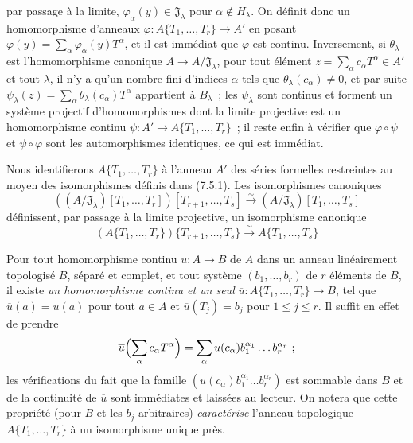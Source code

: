\begin{env}[7.5.1]
par passage à la limite, $\varphi_\alpha(y)\in\mathfrak J_\lambda$ pour
$\alpha\notin H_\lambda$. On définit donc un homomorphisme d'anneaux
$\varphi:A\{T_1,\ldots,T_r\}\to A'$ en posant
$\varphi(y)=\sum_\alpha\varphi_\alpha(y)T^\alpha$, et il est immédiat que
$\varphi$ est continu. Inversement, si $\theta_\lambda$ est l'homomorphisme
canonique $A\to A/\mathfrak J_\lambda$, pour tout élément
$z=\sum_\alpha c_\alpha T^\alpha\in A'$ et tout $\lambda$, il n'y a qu'un
nombre fini d'indices $\alpha$ tels que $\theta_\lambda(c_\alpha)\neq0$, et
par suite
$\psi_\lambda(z)=\sum_\alpha\theta_\lambda(c_\alpha)T^\alpha$ appartient à
$B_\lambda$~; les $\psi_\lambda$ sont continus et forment un système
projectif d'homomorphismes dont la limite projective est un homomorphisme
continu $\psi:A'\to A\{T_1,\ldots,T_r\}$~; il reste enfin à vérifier que
$\varphi\circ\psi$ et $\psi\circ\varphi$ sont les automorphismes identiques,
ce qui est immédiat.
\end{env}

\begin{env}[7.5.2]
\label{0.7.5.2-fr}
Nous identifierons $A\{T_1,\ldots,T_r\}$ à l'anneau $A'$ des séries formelles
restreintes au moyen des isomorphismes définis dans (7.5.1). Les isomorphismes
canoniques
\[
  ((A/\mathfrak J_\lambda)[T_1,\ldots,T_r])
  [T_{r+1},\ldots,T_s]
  \xrightarrow{\sim}
  (A/\mathfrak J_\lambda)[T_1,\ldots,T_s]
\]
définissent, par passage à la limite projective, un isomorphisme canonique
\[
  (A\{T_1,\ldots,T_r\})\{T_{r+1},\ldots,T_s\}
  \xrightarrow{\sim}
  A\{T_1,\ldots,T_s\}
\]
\end{env}

\begin{env}[7.5.3]
\label{0.7.5.3-fr}
Pour tout homomorphisme continu $u:A\to B$ de $A$ dans un anneau linéairement
topologisé $B$, séparé et complet, et tout système $(b_1,\ldots,b_r)$ de $r$
éléments de $B$, il existe \emph{un homomorphisme continu et un seul}
$\overline u:A\{T_1,\ldots,T_r\}\to B$, tel que $\overline u(a)=u(a)$ pour
tout $a\in A$ et $\overline u(T_j)=b_j$ pour $1\leq j\leq r$. Il suffit en
effet de prendre
\[
  \overline u\Bigl(\sum_\alpha c_\alpha T^\alpha\Bigr)
  =\sum_\alpha u(c_\alpha)b_1^{\alpha_1}\ldots b_r^{\alpha_r}~;
\]
les vérifications du fait que la famille
$(u(c_\alpha)b_1^{\alpha_1}\ldots b_r^{\alpha_r})$ est sommable dans $B$ et
de la continuité de $\overline u$ sont immédiates et laissées au lecteur. On
notera que cette propriété (pour $B$ et les $b_j$ arbitraires)
\emph{caractérise} l'anneau topologique $A\{T_1,\ldots,T_r\}$ à un
isomorphisme unique près.
\end{env}

